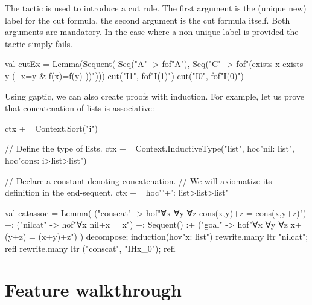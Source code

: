 \documentclass[a4paper,11pt]{article}
\newcommand{\cli}[1]{{\ttfamily {#1}}}
\begin{document}
The \cli{cut} tactic is used to introduce a cut rule. The first argument is the
(unique new) label for the cut formula, the second argument is the cut formula
itself. Both arguments are mandatory. In the case where a non-unique label is
provided the tactic simply fails.
\begin{tacticslisting}
val cutEx = Lemma(Sequent(
    Seq("A" -> fof"A"),
    Seq("C" -> fof"(exists x exists y ( -x=y & f(x)=f(y) ))"))) {
  cut("I1", fof"I(1)")
  cut("I0", fof"I(0)")
}
\end{tacticslisting}

Using gaptic, we can also create proofs with induction.  For example, let us
prove that concatenation of lists is associative:

\begin{tacticslisting}[nosig]
ctx += Context.Sort("i")

// Define the type of lists.
ctx += Context.InductiveType("list",
  hoc"nil: list",
  hoc"cons: i>list>list")

// Declare a constant denoting concatenation.
// We will axiomatize its definition in the end-sequent.
ctx += hoc"'+': list>list>list"

val catassoc =
  Lemma(
      ("conscat" -> hof"∀x ∀y ∀z cons(x,y)+z = cons(x,y+z)") +:
      ("nilcat" -> hof"∀x nil+x = x") +:
      Sequent()
      :+ ("goal" -> hof"∀x ∀y ∀z x+(y+z) = (x+y)+z")
    ) {
  decompose; induction(hov"x: list")
  rewrite.many ltr "nilcat"; refl
  rewrite.many ltr ("conscat", "IHx_0"); refl
}
\end{tacticslisting}
\begin{tacticsoutput}
\end{tacticsoutput}

\section{Feature walkthrough}
\end{document}
